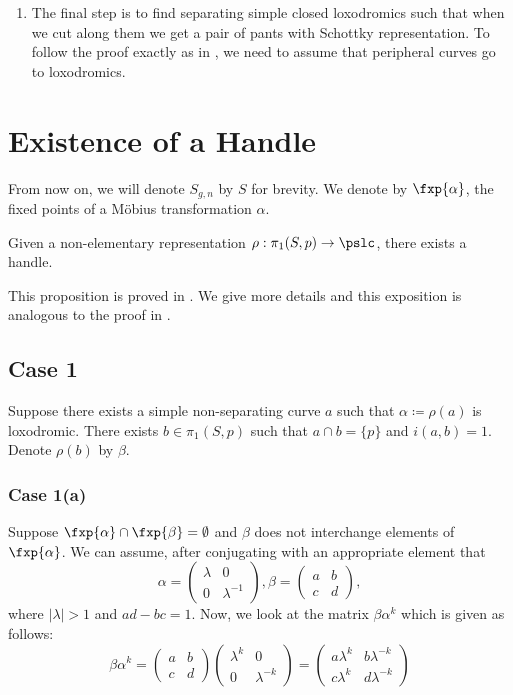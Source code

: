 \begin{enumerate}
	\item The final step is to find separating simple closed loxodromics  such that when we cut along them we get a pair of pants with Schottky representation. To follow the proof exactly as in \cite{GKM}, we need to assume that peripheral curves go to loxodromics. 
\end{enumerate}

\section{Existence of a Handle}\label{sec:HandleExistence}
From now on, we will denote $S_{g,n}$ by $S$ for brevity. We denote by $\fxp{\alpha}$, the fixed points of a M{\"o}bius transformation $\alpha$.
\begin{prop}
	Given a non-elementary representation $\rho:\pi_1(S,p) \rightarrow \pslc$, there exists a handle. 
\end{prop}
This proposition is proved in \cite{LeFils}. We give more details and this exposition is analogous to the proof in \cite{GKM}. 

\subsection{Case 1}  \label{proof:case1} Suppose there exists a simple non-separating curve $a$ such that $\alpha \coloneqq \rho(a)$ is loxodromic. There exists $b \in \pi_1(S,p)$ such that $a \cap b = \{p\}$ and $i(a,b) = 1$. Denote $\rho(b)$ by $\beta$.
\subsubsection{Case 1(a)} \label{proof:case1a} Suppose $\fxp{\alpha} \cap \fxp{\beta} = \emptyset$ and $\beta$ does not interchange elements of $\fxp{\alpha}$. We can assume, after conjugating with an appropriate element that 
\[\alpha = \begin{pmatrix}
	\lambda & 0 \\
	0 & \lambda^{-1}
\end{pmatrix}, 
\beta = \begin{pmatrix}
	a & b\\
	c & d
\end{pmatrix},\]
where $|\lambda|>1$ and $ad - bc = 1$. Now, we look at the matrix $\beta \alpha^k$ which is given as follows:
\[\beta \alpha^k = 
	\begin{pmatrix}
		a & b\\
		c & d
	\end{pmatrix} 
	\begin{pmatrix}
		\lambda^k & 0 \\
		0 & \lambda^{-k}
	\end{pmatrix} = 
	\begin{pmatrix}
		a \lambda^k & b \lambda^{-k} \\
		c \lambda^k & d \lambda^{-k}
	\end{pmatrix}
\]

